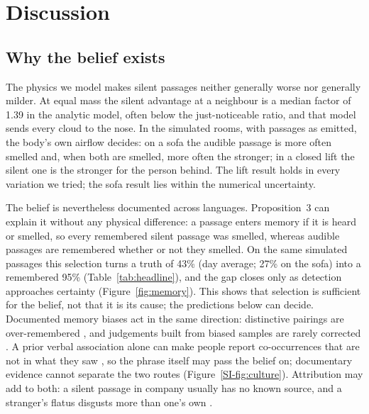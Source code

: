 \section{Discussion}
\label{sec:discussion}

\subsection{Why the belief exists}
The physics we model makes silent passages neither generally worse nor generally milder. At equal mass the silent
advantage at a neighbour is a median factor of 1.39 in the analytic model, often below the just-noticeable ratio, and
that model sends every cloud to the nose. In the simulated rooms, with passages as emitted, the body's own airflow
decides: on a sofa the audible passage is more often smelled and, when both are smelled, more often the stronger; in a
closed lift the silent one is the stronger for the person behind. The lift result holds in every variation we tried;
the sofa result lies within the numerical uncertainty.

The belief is nevertheless documented across languages. Proposition~3 can explain it without any physical difference: a
passage enters memory if it is heard or smelled, so every remembered silent passage was smelled, whereas audible
passages are remembered whether or not they smelled. On the same simulated passages this selection turns a truth of 43\% (day average; 27\% on the
sofa) into a remembered 95\% (Table~\ref{tab:headline}), and the gap closes only as detection approaches certainty
(Figure~\ref{fig:memory}). This shows that selection is sufficient for the belief, not that it is its cause; the
predictions below can decide. Documented memory biases act in the same direction: distinctive pairings are
over-remembered \cite{hamilton1976}, and judgements built from biased samples are rarely corrected
\cite{fiedler2000}. A prior verbal association alone can make people report
co-occurrences that are not in what they saw \cite{chapman1967}, so the phrase itself may pass the belief on; documentary evidence cannot separate the two routes
(Figure~\ref{SI-fig:culture}). Attribution may add to both: a silent passage in company usually has no known source,
and a stranger's flatus disgusts more than one's own \cite{liuzza2016}.

